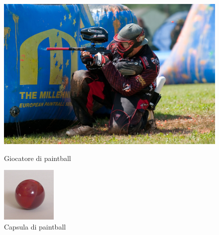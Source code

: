 \documentclass[../Relazione.tex]{subfiles}
\begin{document}
	\begin{figure}[!h]
		\centering
			\begin{minipage}[c]{.50\textwidth}
			  \centering\setlength{\captionmargin}{0pt}%
			  \includegraphics[scale=0.42]{img/sport/player1.jpg}
			  \caption{Giocatore di paintball}
			\end{minipage}%
			\hspace{10mm}%
			\begin{minipage}[c]{.40\textwidth}
			  \centering\setlength{\captionmargin}{0pt}%
			  \includegraphics[width=.40\textwidth]{img/sport/paint.png}
			  \caption{Capsula di paintball}
			\end{minipage}
		\label{fig:minipage2}
	\end{figure}

\newpage	
\end{document}
